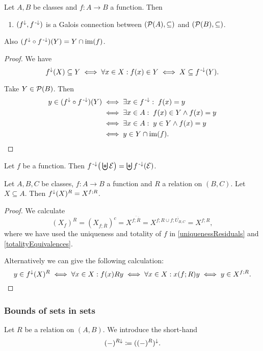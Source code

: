 \begin{proposition}
Let $A,B$ be classes and $f:A\to B$ a function. Then
\begin{enumerate}
\item $(f^\downarrow,f^{\text{\hspace{0.15em}-}\downarrow})$ is a Galois connection between $\sSet{\powerset(A), \subseteq}$ and $\sSet{\powerset(B), \subseteq}$.
\end{enumerate}
Also $(f^\downarrow\circ f^{{\text{\hspace{0.15em}-}\downarrow}})(Y) = Y\cap \operatorname{im}(f)$.
\end{proposition}
\begin{proof}
We have
\[ f^\downarrow(X) \subseteq Y \iff \forall x\in X: f(x) \in Y \iff X \subseteq f^{{\text{\hspace{0.15em}-}\downarrow}}(Y). \]

Take $Y\in \operatorname{\mathcal{P}}(B)$. Then
\begin{align*}
y\in (f^\downarrow\circ f^{{\text{\hspace{0.15em}-}\downarrow}})(Y) &\iff \exists x\in f^{{\text{\hspace{0.15em}-}\downarrow}}:\; f(x) = y \\
&\iff \exists x\in A: \;f(x)\in Y \land f(x) = y \\
&\iff \exists x\in A: \;y \in Y \land f(x) = y \\
&\iff y\in Y\cap \operatorname{im}(f).
\end{align*}
\end{proof}





\begin{lemma}
Let $f$ be a function. Then $f^{{\text{\hspace{0.15em}-}\downarrow}}\big(\biguplus \mathcal{E}\big) = \biguplus f^{\text{\hspace{0.15em}-}\downarrow}(\mathcal{E})$.
\end{lemma}

\begin{lemma} \label{functionUpperbound}
Let $A,B,C$ be classes, $f: A\to B$ a function and $R$ a relation on $(B,C)$. Let $X \subseteq A$. Then $f^\downarrow(X)^R = X^{f;R}$.
\end{lemma}
\begin{proof}
We calculate
\[ (X_f)^{R} = (X_{f;\overline{R}})^c = X^{\overline{f;\overline{R}}} = X^{f;R \cup \overline{f;U_{B,C}}} = X^{f;R}, \]
where we have used the uniqueness and totality of $f$ in \ref{uniquenessResiduals} and \ref{totalityEquivalences}.

Alternatively we can give the following calculation:
\[ y\in f^\downarrow(X)^R \iff \forall x\in X: f(x)Ry \iff \forall x\in X: x(f;R)y \iff y\in X^{f;R}. \]
\end{proof}

\subsubsection{Bounds of sets in sets}
\begin{definition}
Let $R$ be a relation on $(A,B)$. We introduce the short-hand
\[ (-)^{R\downarrow} \coloneqq ((-)^R)^\downarrow. \]
\end{definition}

